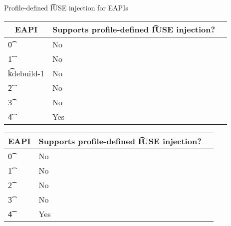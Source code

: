 \begin{centertable}{Profile-defined \t{IUSE} injection for EAPIs} \label{tab:profile-iuse-injection-table}
\IFKDEBUILDELSE
{
    \begin{tabular}{ l l l }
        \toprule
        \multicolumn{1}{c}{\textbf{EAPI}} &
        \multicolumn{1}{c}{\textbf{Supports profile-defined \t{IUSE} injection?}} \\
        \midrule
    \t{0} & No \\
    \t{1} & No \\
    \t{kdebuild-1} & No \\
    \t{2} & No \\
    \t{3} & No \\
    \t{4} & Yes \\
    \bottomrule
    \end{tabular}
}{
    \begin{tabular}{ l l l }
        \toprule
        \multicolumn{1}{c}{\textbf{EAPI}} &
        \multicolumn{1}{c}{\textbf{Supports profile-defined \t{IUSE} injection?}} \\
        \midrule
    \t{0} & No \\
    \t{1} & No \\
    \t{2} & No \\
    \t{3} & No \\
    \t{4} & Yes \\
    \bottomrule
    \end{tabular}
}
\end{centertable}

